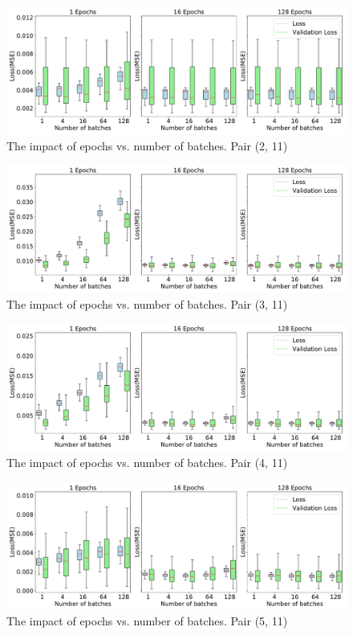 	\begin{figure}[H]
		\centering
		\includegraphics[width=1\linewidth]{Pictures/Results/experiment_4_2}
		\caption{The impact of epochs vs. number of batches. Pair (2, 11)}
		\label{fig:experiment_4_2}
	\end{figure}
	\begin{figure}[H]
		\centering
		\includegraphics[width=1\linewidth]{Pictures/Results/experiment_4_3}
		\caption{The impact of epochs vs. number of batches. Pair (3, 11)}
		\label{fig:experiment_4_3}
	\end{figure}
	\begin{figure}[H]
		\centering
		\includegraphics[width=1\linewidth]{Pictures/Results/experiment_4_4}
		\caption{The impact of epochs vs. number of batches. Pair (4, 11)}
		\label{fig:experiment_4_4}
	\end{figure}
	\begin{figure}[H]
		\centering
		\includegraphics[width=1\linewidth]{Pictures/Results/experiment_4_5}
		\caption{The impact of epochs vs. number of batches. Pair (5, 11)}
		\label{fig:experiment_4_5}
	\end{figure}



